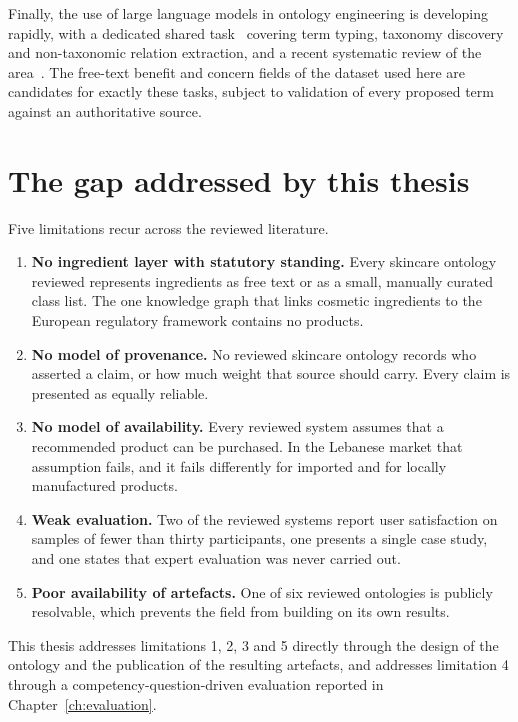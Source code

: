 Finally, the use of large language models in ontology engineering is developing
rapidly, with a dedicated shared task~\cite{llms4ol2024} covering term typing,
taxonomy discovery and non-taxonomic relation extraction, and a recent
systematic review of the area~\cite{li2026llmoe}. The free-text benefit and
concern fields of the dataset used here are candidates for exactly these tasks,
subject to validation of every proposed term against an authoritative source.

\section{The gap addressed by this thesis}
\label{sec:rw-gap}

Five limitations recur across the reviewed literature.

\begin{enumerate}
  \item \textbf{No ingredient layer with statutory standing.} Every skincare
    ontology reviewed represents ingredients as free text or as a small,
    manually curated class list. The one knowledge graph that links cosmetic
    ingredients to the European regulatory framework contains no products.
  \item \textbf{No model of provenance.} No reviewed skincare ontology records
    who asserted a claim, or how much weight that source should carry. Every
    claim is presented as equally reliable.
  \item \textbf{No model of availability.} Every reviewed system assumes that a
    recommended product can be purchased. In the Lebanese market that assumption
    fails, and it fails differently for imported and for locally manufactured
    products.
  \item \textbf{Weak evaluation.} Two of the reviewed systems report user
    satisfaction on samples of fewer than thirty participants, one presents a
    single case study, and one states that expert evaluation was never carried
    out.
  \item \textbf{Poor availability of artefacts.} One of six reviewed ontologies
    is publicly resolvable, which prevents the field from building on its own
    results.
\end{enumerate}

This thesis addresses limitations 1, 2, 3 and 5 directly through the design of
the ontology and the publication of the resulting artefacts, and addresses
limitation 4 through a competency-question-driven evaluation reported in
Chapter~\ref{ch:evaluation}.

